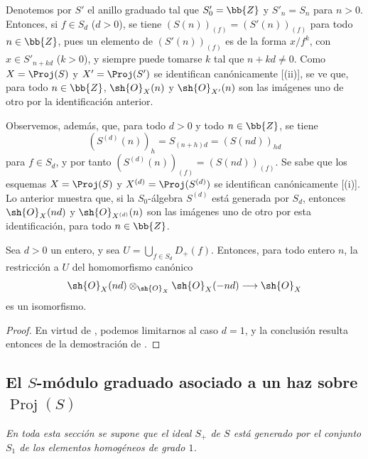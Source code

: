 \documentclass[oneside,10pt]{amsart}
\makeatletter
\newcommand{\ega@arrow}[2]{\mathchoice{#1}{#2}{#2}{#2}}
\renewcommand{\to}{\ega@arrow{\longrightarrow}{\rightarrow}}
\let\EGAOriginalLabel\label
\renewcommand{\label}[1]{\phantomsection\EGAOriginalLabel{#1}}
\makeatother
\begin{document}
\begin{env}[2.5.16]
\label{II.2.5.16}
Denotemos por $S'$ el anillo graduado tal que $S'_0=\bb{Z}$ y $S'_n=S_n$ para $n>0$.
Entonces, si $f\in S_d$ ($d>0$), se tiene $(S(n))_{(f)}=(S'(n))_{(f)}$ para todo $n\in\bb{Z}$, pues un elemento de $(S'(n))_{(f)}$ es de la forma $x/f^k$, con $x\in S'_{n+kd}$ ($k>0$), y siempre puede tomarse $k$ tal que $n+kd\neq0$.
Como $X=\Proj(S)$ y $X'=\Proj(S')$ se identifican canónicamente [(ii)], se ve que, para todo $n\in\bb{Z}$, $\sh{O}_X(n)$ y $\sh{O}_{X'}(n)$ son las imágenes uno de otro por la identificación anterior.

Observemos, además, que, para todo $d>0$ y todo $n\in\bb{Z}$, se tiene
\[
  (S^{(d)}(n))_h=S_{(n+h)d}=(S(nd))_{hd}
\]
para $f\in S_d$, y por tanto $(S^{(d)}(n))_{(f)}=(S(nd))_{(f)}$.
Se sabe que los esquemas $X=\Proj(S)$ y $X^{(d)}=\Proj(S^{(d)})$ se identifican canónicamente [(i)].
Lo anterior muestra que, si la $S_0$-álgebra $S^{(d)}$ está generada por $S_d$, entonces $\sh{O}_X(nd)$ y $\sh{O}_{X^{(d)}}(n)$ son las imágenes uno de otro por esta identificación, para todo $n\in\bb{Z}$.
\end{env}

\begin{proposition}[2.5.17]
\label{II.2.5.17}
Sea $d>0$ un entero, y sea $U=\bigcup_{f\in S_d}D_+(f)$.
Entonces, para todo entero $n$, la restricción a $U$ del homomorfismo canónico
\[
  \sh{O}_X(nd)\otimes_{\sh{O}_X}\sh{O}_X(-nd)\to\sh{O}_X
\]
es un isomorfismo.
\end{proposition}

\begin{proof}
En virtud de , podemos limitarnos al caso $d=1$, y la conclusión resulta entonces de la demostración de .
\end{proof}

\subsection{El $S$-módulo graduado asociado a un haz sobre $\operatorname{Proj}(S)$}
\label{subsection:II.2.6}

\emph{En toda esta sección se supone que el ideal $S_+$ de $S$ está generado por el conjunto $S_1$ de los elementos homogéneos de grado $1$.}
\end{document}
